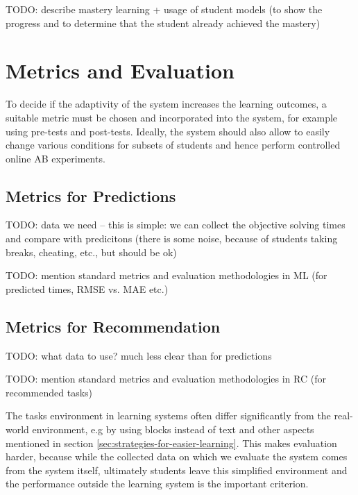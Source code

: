 TODO: describe mastery learning + usage of student models (to show the progress
and to determine that the student already achieved the mastery)


\section{Metrics and Evaluation}
\label{sec:metrics-and-evaluation}

To decide if the adaptivity of the system increases the learning outcomes,
  a suitable metric must be chosen and incorporated into the system,
  for example using pre-tests and post-tests.
Ideally, the system should also allow to easily change various conditions
  for subsets of students and hence perform controlled online AB experiments.


\subsection{Metrics for Predictions}

TODO: data we need -- this is simple: we can collect the objective solving times and compare
with predicitons (there is some noise, because of students taking breaks, cheating, etc., but should be ok)

TODO: mention standard metrics and evaluation methodologies in ML (for
predicted times, RMSE vs. MAE etc.)


\subsection{Metrics for Recommendation}

TODO: what data to use? much less clear than  for predictions

TODO: mention standard metrics and evaluation methodologies in RC (for recommended tasks)

The tasks environment in learning systems often differ significantly
  from the real-world environment,
  e.g by using blocks instead of text
  and other aspects mentioned in section \ref{sec:strategies-for-easier-learning}.
This makes evaluation harder, because while the collected data on which we
  evaluate the system comes from the system itself,
  ultimately students leave this simplified environment
  and the performance outside the learning system is the important criterion.



